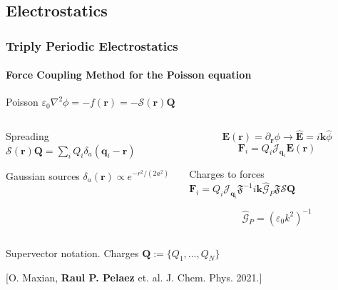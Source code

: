 \documentclass[xcolor=dvipsnames, compress]{beamer}
\newcommand{\ppos}{q}
\newcommand{\fpos}{r}
\renewcommand{\vec}[1]{\bm{#1}}
\newcommand{\oper}[1]{\mathcal{#1}}
\newcommand{\fou}[1]{\widehat{#1}}
\begin{document}
\subsection{Electrostatics}
\begin{frame}
  \frametitle{Triply Periodic Electrostatics}
  \framesubtitle{Force Coupling Method for the Poisson equation}
  \begin{center}
    \begin{minipage}{0.7\linewidth}    
      \begin{block}{Poisson}
        \Large \centering $\varepsilon_0\nabla^2\phi = -f(\vec{r}) = -\oper{S}(\vec{r})\vec{Q}$
      \end{block}
    \end{minipage}
  \end{center}
  \begin{overlayarea}{\linewidth}{0.5\paperheight}
    \begin{columns}[T]
      \begin{column}{0.39\linewidth}
        \begin{block}{Spreading}
          \centering $\oper{S}(\vec{r})\vec{Q} = \sum_i Q_i \delta_a(\vec{\ppos}_i - \vec{r})$
        \end{block}
        \begin{block}{Gaussian sources}
          \centering$\delta_a(\vec{r})\propto e^{-r^2/(2a^2)}$
        \end{block}        
      \end{column}
      \begin{column}{0.59\linewidth}
          \begin{equation*}
            \vec{E}(\vec{\fpos}) = \partial_{\vec{\fpos}}\phi \rightarrow \fou{\vec{E}} = i\vec{k}\fou{\phi}
          \end{equation*}
          \begin{equation*}
            \vec{F}_i = Q_i\oper{J}_{\vec{\ppos}_i}\vec{E}(\vec{r})
          \end{equation*}
        \begin{block}{Charges to forces}
          \centering \Large $\vec{F}_i = Q_i\oper{J}_{\vec{q}_i}\mathfrak{F}^{-1}i\vec{k}\fou{\oper{G}}_P\mathfrak{F}\oper{S}\vec{Q}$
        \end{block}
        $$\fou{\oper{G}}_P = \left(\varepsilon_0 k^2\right)^{-1}$$
      \end{column}
    \end{columns}
  \end{overlayarea}
  \footnotesize Supervector notation. Charges $\vec{Q} := \{Q_1,\dots,Q_N\}$
  \begin{center}
    \small [O. Maxian, {\bf Raul P. Pelaez} et. al. J. Chem. Phys. 2021.]
  \end{center}
\end{frame}
\end{document}
